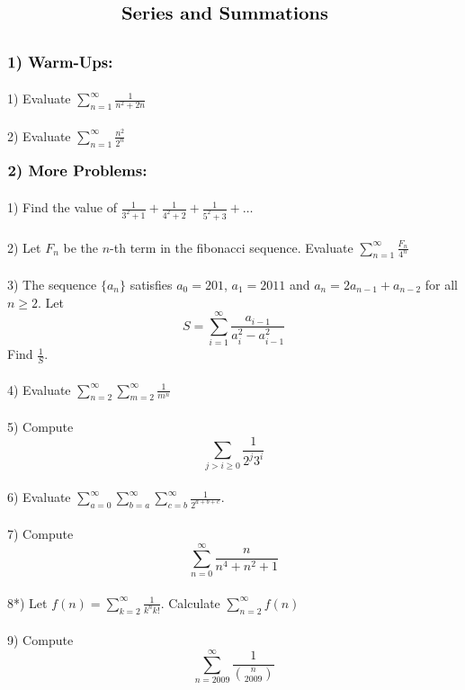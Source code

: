 \documentclass{article}
\begin{document}
$\centerline{\Large \textbf{Series and Summations}}$
\\
\\
\\
$\large \textbf{1)  Warm-Ups:}$  \\
\\
1) Evaluate $\displaystyle\sum_{n=1}^{\infty}\frac{1}{n^2+2n}$
\\
\\
2) Evaluate $\displaystyle\sum_{n=1}^{\infty} \frac{n^2}{2^n}$
\\
\\
$\large \textbf{2)  More Problems:}$  \\
\\
1) Find the value of $\frac{1}{3^2+1}+\frac{1}{4^2+2}+\frac{1}{5^2+3}+\ldots$
\\
\\
2) Let $F_n$ be the $n$-th term in the fibonacci sequence. Evaluate $\displaystyle\sum_{n=1}^{\infty} \frac{F_n}{4^{n}}$
\\
\\
3) The sequence $\{a_n\}$ satisfies $a_0=201$, $a_1=2011$ and $a_n=2a_{n-1}+a_{n-2}$ for all $n\ge 2$. Let
\begin{equation*}
S=\sum_{i=1}^{\infty} \frac{a_{i-1}}{a_i^2-a_{i-1}^2}
\end{equation*}
Find $\frac{1}{S}$.
\\
\\
4) Evaluate $\displaystyle\sum_{n=2}^{\infty}\displaystyle\sum_{m=2}^{\infty}\frac{1}{m^n}$
\\
\\
5) Compute
\begin{equation*}
\sum_{j>i\ge 0} \frac{1}{2^j3^i}
\end{equation*}
\\
6) Evaluate $\displaystyle\sum_{a = 0}^{\infty}\sum_{b=a}^{\infty}\sum_{c=b}^{\infty} \frac{1}{2^{a+b+c}}$.
\\
\\
7) Compute 
\begin{equation*}
\displaystyle\sum_{n=0}^{\infty}\frac{n}{n^4+n^2+1}
\end{equation*}
\\
8*) Let $f(n)=\displaystyle\sum_{k=2}^{\infty} \frac{1}{k^nk!}$.  Calculate $\displaystyle\sum_{n=2}^{\infty}f(n)$
\\
\\
9) Compute
\begin{equation*}
\sum_{n=2009}^\infty \frac{1}{\binom{n}{2009}}
\end{equation*}
\end{document}

